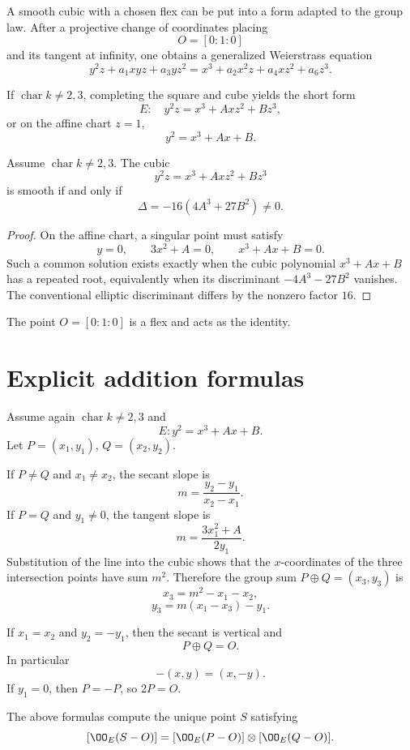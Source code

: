 A smooth cubic with a chosen flex can be put into a form adapted to the group law.  After a projective change of coordinates placing
\[
  O=[0:1:0]
\]
and its tangent at infinity, one obtains a generalized Weierstrass equation
\[
  y^2z+a_1xyz+a_3yz^2
  =x^3+a_2x^2z+a_4xz^2+a_6z^3.
\]

If \(\operatorname{char}k\neq2,3\), completing the square and cube yields the short form
\[
  E:\quad y^2z=x^3+Axz^2+Bz^3,
\]
or on the affine chart \(z=1\),
\[
  y^2=x^3+Ax+B.
\]

\begin{proposition}\label{prop:vi43-discriminant}
Assume \(\operatorname{char}k\neq2,3\).  The cubic
\[
  y^2z=x^3+Axz^2+Bz^3
\]
is smooth if and only if
\[
  \Delta=-16(4A^3+27B^2)\neq0.
\]
\end{proposition}

\begin{proof}
On the affine chart, a singular point must satisfy
\[
  y=0,
  \qquad
  3x^2+A=0,
  \qquad
  x^3+Ax+B=0.
\]
Such a common solution exists exactly when the cubic polynomial \(x^3+Ax+B\) has a repeated root, equivalently when its discriminant \(-4A^3-27B^2\) vanishes.  The conventional elliptic discriminant differs by the nonzero factor \(16\).
\end{proof}

The point \(O=[0:1:0]\) is a flex and acts as the identity.

\section{Explicit addition formulas}

Assume again \(\operatorname{char}k\neq2,3\) and
\[
  E:y^2=x^3+Ax+B.
\]
Let \(P=(x_1,y_1)\), \(Q=(x_2,y_2)\).

If \(P\neq Q\) and \(x_1\neq x_2\), the secant slope is
\[
  m=\frac{y_2-y_1}{x_2-x_1}.
\]
If \(P=Q\) and \(y_1\neq0\), the tangent slope is
\[
  m=\frac{3x_1^2+A}{2y_1}.
\]
Substitution of the line into the cubic shows that the \(x\)-coordinates of the three intersection points have sum \(m^2\).  Therefore the group sum \(P\oplus Q=(x_3,y_3)\) is
\[
  \boxed{x_3=m^2-x_1-x_2,}
\]
\[
  \boxed{y_3=m(x_1-x_3)-y_1.}
\]

If \(x_1=x_2\) and \(y_2=-y_1\), then the secant is vertical and
\[
  P\oplus Q=O.
\]
In particular
\[
  -(x,y)=(x,-y).
\]
If \(y_1=0\), then \(P=-P\), so \(2P=O\).

\begin{proposition}\label{prop:vi43-coordinate-picard}
The above formulas compute the unique point \(S\) satisfying
\[
  [\OO_E(S-O)]
  =
  [\OO_E(P-O)]\otimes[\OO_E(Q-O)].
\]
\end{proposition}

